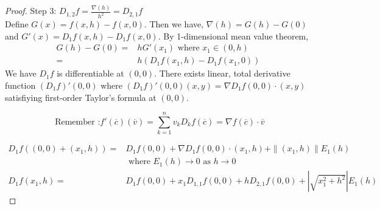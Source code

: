 \begin{proof}
	\par{Step 3:} $D_{1,2} f = \frac{\nabla(h)}{h^2} = D_{2,1} f$\\

	Define $G(x) = f(x,h)-f(x,0)$. Then  we have, $\nabla(h) = G(h)-G(0)$ and $G'(x) = D_1f(x,h) - D_1f(x,0)$. By 1-dimensional mean value theorem,
	\begin{align*}
		G(h)-G(0) = & hG'(x_1)  \text{ where } x_1 \in (0,h) \\
		= & h\left( D_1f(x_1,h)-D_1f(x_1,0)\right)
	\end{align*}
	We have $D_1 f$ is differentiable at $(0,0)$. There exists linear, total derivative function $(D_1f)'(0,0)$ where $(D_1f)'(0,0)(x,y) = \nabla D_1 f(0,0) \cdot{} (x,y)$ satisfiying first-order Taylor's formula at $(0,0)$.\\ 
	\begin{commentary}
		\[ \text{ Remember :} f'(\overline{c})(\overline{v}) = \sum_{k = 1}^n v_k D_k f(\overline{c}) = \nabla f(\overline{c}) \cdot{} \overline{v} \]
	\end{commentary}
	\begin{align*}
		D_1 f((0,0) + (x_1,h)) = & D_1 f(0,0) + \nabla D_1 f(0,0) \cdot{} (x_1,h) + \|(x_1,h)\| E_1(h) \\
		& \text{ where } E_1(h) \to 0 \text{ as } h \to 0\\
		D_1 f(x_1,h) = & D_1 f(0,0) + x_1 D_{1,1} f(0,0) + h D_{2,1} f(0,0) + \left|\sqrt{x_1^2+h^2}\right| E_1(h)
	\end{align*}
	

\end{proof}
